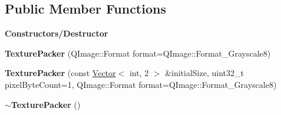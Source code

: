 \subsection*{Public Member Functions}
\begin{Indent}\textbf{ Constructors/\+Destructor}\par
\begin{DoxyCompactItemize}
\item 
\mbox{\label{classrev_1_1_texture_packer_ada8a51d6ea9875fe46e6047a59a48178}} 
{\bfseries Texture\+Packer} (Q\+Image\+::\+Format format=Q\+Image\+::\+Format\+\_\+\+Grayscale8)
\item 
\mbox{\label{classrev_1_1_texture_packer_a72a30521ccfb9ec6f00959807cefa465}} 
{\bfseries Texture\+Packer} (const \mbox{\hyperlink{classrev_1_1_vector}{Vector}}$<$ int, 2 $>$ \&initial\+Size, uint32\+\_\+t pixel\+Byte\+Count=1, Q\+Image\+::\+Format format=Q\+Image\+::\+Format\+\_\+\+Grayscale8)
\item 
\mbox{\label{classrev_1_1_texture_packer_a09db63fb3ac99fd569433078012588dc}} 
{\bfseries $\sim$\+Texture\+Packer} ()
\end{DoxyCompactItemize}
\end{Indent}
